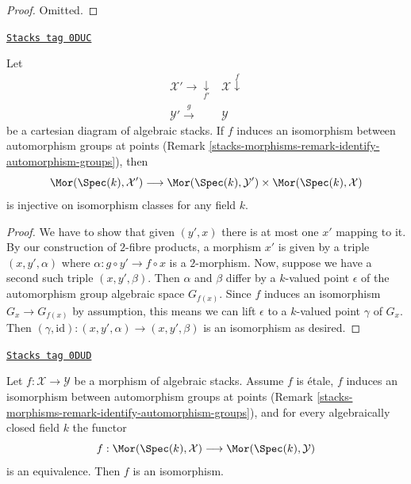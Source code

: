 \begin{proof}
Omitted.
\end{proof}

\begin{lemma}
\label{stacks-morphisms-lemma-stabilizer-preserving-points-cartesian}
\href{https://stacks.math.columbia.edu/tag/0DUC}{\texttt{Stacks tag 0DUC}}

Let
$$
\begin{array}{cc}\mathcal{X}' \longrightarrow\underset{f'}{\downarrow} & \mathcal{X} \overset{f}{\downarrow} \\ \mathcal{Y}' \overset{g}{\longrightarrow} & \mathcal{Y}\end{array}
$$
be a cartesian diagram of algebraic stacks. If $f$ induces an isomorphism
between automorphism groups at points
(Remark \ref{stacks-morphisms-remark-identify-automorphism-groups}),
then
$$
\Mor(\Spec(k), \mathcal{X}')
\longrightarrow
\Mor(\Spec(k), \mathcal{Y}') \times \Mor(\Spec(k), \mathcal{X})
$$
is injective on isomorphism classes for any field $k$.
\end{lemma}

\begin{proof}
We have to show that given $(y', x)$ there is at most one $x'$
mapping to it.
By our construction of $2$-fibre products, a morphism
$x'$ is given by a triple $(x, y', \alpha)$
where  $\alpha : g \circ y' \to f \circ x$ is a $2$-morphism.
Now, suppose we have a second such triple $(x, y', \beta)$.
Then $\alpha$ and $\beta$ differ by a $k$-valued point
$\epsilon$ of the automorphism group algebraic space $G_{f(x)}$.
Since $f$ induces an isomorphism $G_x \to G_{f(x)}$ by
assumption, this means we can lift $\epsilon$ to a $k$-valued point
$\gamma$ of $G_x$. Then $(\gamma, \text{id}) : (x, y', \alpha) \to
(x, y', \beta)$ is an isomorphism as desired.
\end{proof}

\begin{lemma}
\label{stacks-morphisms-lemma-etale-iso}
\href{https://stacks.math.columbia.edu/tag/0DUD}{\texttt{Stacks tag 0DUD}}

Let $f : \mathcal{X} \to \mathcal{Y}$ be a morphism of algebraic stacks.
Assume $f$ is \'etale, $f$ induces an isomorphism
between automorphism groups at points
(Remark \ref{stacks-morphisms-remark-identify-automorphism-groups}),
and for every algebraically closed field $k$ the functor
$$
f : \Mor(\Spec(k), \mathcal{X}) \longrightarrow \Mor(\Spec(k), \mathcal{Y})
$$
is an equivalence. Then $f$ is an isomorphism.
\end{lemma}

